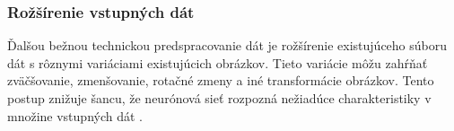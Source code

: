 \subsubsection{Rožšírenie vstupných dát}
Ďalšou bežnou technickou predspracovanie dát je rožšírenie existujúceho súboru dát s rôznymi variáciami existujúcich obrázkov.
Tieto variácie môžu zahŕňať zväčšovanie, zmenšovanie, rotačné zmeny a iné transformácie obrázkov.
Tento postup znižuje šancu, že neurónová sieť rozpozná nežiadúce charakteristiky v množine vstupných dát \cite{odkaz:NNPreprocessing}.
